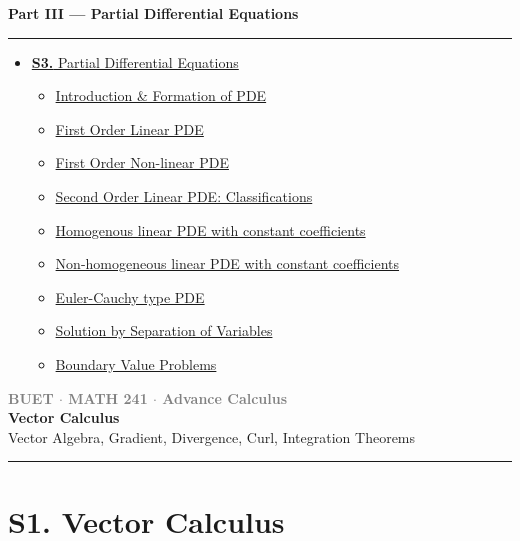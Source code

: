 \documentclass[12pt]{article}
\newcommand{\secdivider}[3]{%
  \newpage\thispagestyle{empty}%
  \vspace*{\fill}%
  \begin{tcolorbox}[enhanced,colback=#3!6,colframe=#3,boxrule=1.5pt,arc=8pt,
    left=20pt,right=20pt,top=22pt,bottom=22pt,
    shadow={3pt}{-3pt}{0pt}{black!15}]
    \centering
    {\large\textcolor{gray}{\textbf{BUET $\cdot$ MATH 241 $\cdot$ Advance Calculus}}}\\[8pt]
    {\fontsize{26}{32}\selectfont\bfseries\textcolor{#3}{#1}}\\[6pt]
    {\fontsize{15}{19}\selectfont\textcolor{dgray}{#2}}\\[12pt]
    \textcolor{#3!60}{\rule{0.5\textwidth}{0.5pt}}
  \end{tcolorbox}%
  \vspace*{\fill}\newpage%
}
\begin{document}
\begin{tcolorbox}[breakable,colback=cC!5,colframe=cC,boxrule=1pt,arc=5pt,
  left=8pt,right=8pt,top=8pt,bottom=8pt,before skip=4pt]
  {\large\bfseries\textcolor{cC}{Part III --- Partial Differential Equations}}\par\vspace{5pt}
  \textcolor{cC!40}{\rule{\linewidth}{0.4pt}}\par\vspace{3pt}
  \small\begin{itemize}[leftmargin=1.2em,itemsep=1pt,label={\textcolor{cC}{$\triangleright$}}]
    \item \hyperref[sec:S6]{\textbf{S3.} Partial Differential Equations}
      \begin{itemize}[leftmargin=1.5em,itemsep=0pt,label={\textcolor{cC}{$\cdot$}}]
        \item \hyperref[sub:s6-formation]{Introduction \& Formation of PDE}
        \item \hyperref[sub:s6-first]{First Order Linear PDE}
        \item \hyperref[sub:s6-firstNon]{First Order Non-linear PDE}
        \item \hyperref[sub:s6-second]{Second Order Linear PDE: Classifications}
        \item \hyperref[sub:s6-hhigher]{Homogenous linear PDE with constant coefficients}
        \item \hyperref[sub:s6-Nhhigher]{Non-homogeneous linear PDE with constant coefficients}
        \item \hyperref[sub:s6-euler]{Euler-Cauchy type PDE}
        \item \hyperref[sub:s6-separation]{Solution by Separation of Variables}
        \item \hyperref[sub:s6-bvp]{Boundary Value Problems}
      \end{itemize}
  \end{itemize}
\end{tcolorbox}


\newpage

\secdivider{Vector Calculus}{Vector Algebra, Gradient, Divergence, Curl, Integration Theorems}{cA}

\section{S1. Vector Calculus}
\label{sec:S4}
\end{document}

